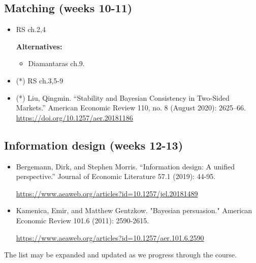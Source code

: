 \documentclass{article}
\begin{document}
\subsection{Matching (weeks 10-11)}
\begin{itemize}
	\item RS ch.2,4
	
	\textbf{Alternatives:}
	\begin{itemize}
		\item Diamantaras ch.9.
	\end{itemize}
	\item (*) RS ch.3,5-9
	\item (*) Liu, Qingmin. “Stability and Bayesian Consistency in Two-Sided Markets.” American Economic Review 110, no. 8 (August 2020): 2625–66. \url{https://doi.org/10.1257/aer.20181186}
	
\end{itemize}

\subsection{Information design (weeks 12-13)}
\begin{itemize}
	\item Bergemann, Dirk, and Stephen Morris. ``Information design: A unified perspective.'' Journal of Economic Literature 57.1 (2019): 44-95. 
	
	\url{https://www.aeaweb.org/articles?id=10.1257/jel.20181489}
%	
	\item Kamenica, Emir, and Matthew Gentzkow. "Bayesian persuasion." American Economic Review 101.6 (2011): 2590-2615.
	
	\url{https://www.aeaweb.org/articles?id=10.1257/aer.101.6.2590}
\end{itemize}

\bigskip
The list may be expanded and updated as we progress through the course.


\end{document}
